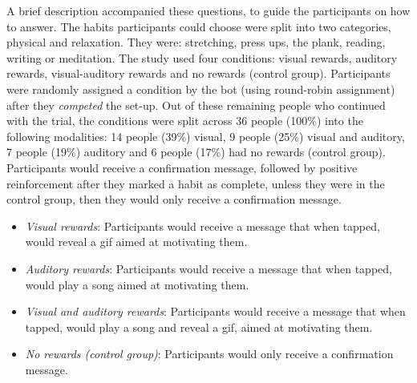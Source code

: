 \documentclass{scaffold/sigchi}
\begin{document}
A brief description accompanied these questions, to guide the participants on how to answer. The habits participants could choose were split into two categories, physical and relaxation. They were: stretching, press ups, the plank, reading, writing or meditation.\newline
\newline
The study used four conditions: visual rewards, auditory rewards, visual-auditory rewards and no rewards (control group). Participants were randomly assigned a condition by the bot (using round-robin assignment) after they \textit{competed} the set-up. Out of these remaining people who continued with the trial, the conditions were split across 36 people (100\%) into the following modalities: 14 people (39\%) visual, 9 people (25\%) visual and auditory, 7 people (19\%) auditory and 6 people (17\%) had no rewards (control group).\newline
\newline
Participants would receive a confirmation message, followed by positive reinforcement after they marked a habit as complete, unless they were in the control group, then they would only receive a confirmation message.
\begin{itemize}
\item \textit{Visual rewards}: Participants would receive a message that when tapped, would reveal a gif aimed at motivating them.
\item \textit{Auditory rewards}: Participants would receive a message that when tapped, would play a song aimed at motivating them.
\item \textit{Visual and auditory rewards}: Participants would receive a message that when tapped, would play a song and reveal a gif, aimed at motivating them.
\item \textit{No rewards (control group)}: Participants would only receive a confirmation message.
\end{itemize}
\end{document}
